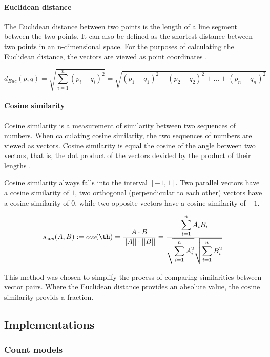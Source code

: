 \documentclass[14pt, a4paper]{extreport}
\begin{document}
\paragraph{Euclidean distance}

The Euclidean distance between two points is the length of a line segment between the two points. It can also be defined as the shortest distance between two points in an n-dimensional space. For the purposes of calculating the Euclidean distance, the vectors are viewed as point coordinates \parencite{oduntan}.

\medskip
\[d_{Euc}(p, q) = \sqrt{\displaystyle\sum_{i=1}^{n} (p_i - q_i)^2} = \sqrt{(p_1 - q_1)^2 + (p_2 - q_2)^2 + ... + (p_n - q_n)^2}\]

\paragraph{Cosine similarity}

Cosine similarity is a measurement of similarity between two sequences of numbers. When calculating cosine similarity, the two sequences of numbers are viewed as vectors. Cosine similarity is equal the cosine of the angle between two vectors, that is, the dot product of the vectors devided by the product of their lengths \parencite{oduntan}.

Cosine similarity always falls into the interval \([-1, 1]\). Two parallel vectors have 
a cosine similarity of \(1\), two orthogonal (perpendicular to each other) vectors have a cosine similarity of \(0\), while two opposite vectors have a cosine similarity of \(-1\).

\medskip
\[s_{cos}(A, B) := cos(\th) = \frac {A \cdot B}{||A|| \cdot ||B||} = \frac {\displaystyle\sum_{i=1}^{n} A_i B_i}{\sqrt{\displaystyle\sum_{i=1}^{n} A_i^2} \sqrt{\displaystyle\sum_{i=1}^{n} B_i^2}}\]
\medskip

This method was chosen to simplify the process of comparing similarities between vector pairs. Where the Euclidean distance provides an absolute value, the cosine similarity provids a fraction.


\subsection{Implementations}

\subsubsection{Count models}
\end{document}
